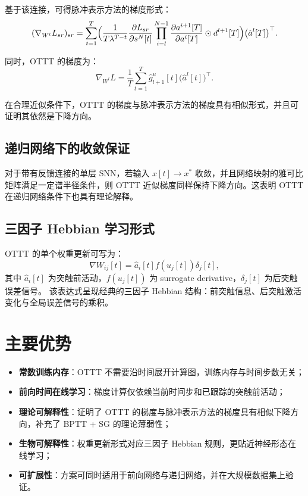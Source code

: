 \documentclass[journal,12pt,onecolumn]{IEEEtran}
\begin{document}
基于该连接，可得脉冲表示方法的梯度形式：
\begin{equation}
  (\nabla_{W^l} L_{sr})_{sr} = \sum_{t=1}^T \Bigl( \frac{1}{T \lambda^{T-t}} \frac{\partial L_{sr}}{\partial s^N[t]} \prod_{i=l}^{N-1} \frac{\partial a^{i+1}[T]}{\partial a^i[T]} \odot d^{l+1}[T] \Bigr) \bigl(\hat a^l[T]\bigr)^\top.
\end{equation}

同时，OTTT 的梯度为：
\begin{equation}
  \nabla_{W^l} L = \frac{1}{T} \sum_{t=1}^T \hat g^{u}_{l+1}[t] \bigl(\hat a^l[t]\bigr)^\top.
\end{equation}

在合理近似条件下，OTTT 的梯度与脉冲表示方法的梯度具有相似形式，并且可证明其依然是下降方向。

\subsection{递归网络下的收敛保证}
对于带有反馈连接的单层 SNN，若输入 $x[t]\to x^*$ 收敛，并且网络映射的雅可比矩阵满足一定谱半径条件，则 OTTT 近似梯度同样保持下降方向。这表明 OTTT 在递归网络条件下也具有理论解释。

\subsection{三因子 Hebbian 学习形式}
OTTT 的单个权重更新可写为：
\begin{equation}
  \nabla W_{ij}[t] = \hat a_i[t] f(u_j[t]) \delta_j[t],
\end{equation}
其中 $\hat a_i[t]$ 为突触前活动，$f(u_j[t])$ 为 surrogate derivative，$\delta_j[t]$ 为后突触误差信号。
该表达式呈现经典的三因子 Hebbian 结构：前突触信息、后突触激活变化与全局误差信号的乘积。

\section{主要优势}
\begin{itemize}[leftmargin=*]
  \item \textbf{常数训练内存}：OTTT 不需要沿时间展开计算图，训练内存与时间步数无关；
  \item \textbf{前向时间在线学习}：梯度计算仅依赖当前时间步和已跟踪的突触前活动；
  \item \textbf{理论可解释性}：证明了 OTTT 的梯度与脉冲表示方法的梯度具有相似下降方向，补充了 BPTT + SG 的理论薄弱性；
  \item \textbf{生物可解释性}：权重更新形式对应三因子 Hebbian 规则，更贴近神经形态在线学习；
  \item \textbf{可扩展性}：方案可同时适用于前向网络与递归网络，并在大规模数据集上验证。
\end{itemize}
\end{document}
